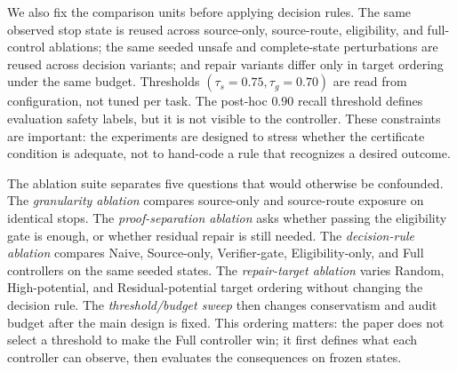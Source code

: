 \documentclass[letterpaper,10pt,twocolumn]{article}
\begin{document}
We also fix the comparison units before applying decision rules. The same
observed stop state is reused across source-only, source-route, eligibility, and
full-control ablations; the same seeded unsafe and complete-state perturbations
are reused across decision variants; and repair variants differ only in target
ordering under the same budget. Thresholds \((\tau_s=0.75,\tau_g=0.70)\) are
read from configuration, not tuned per task. The post-hoc \(0.90\) recall
threshold defines evaluation safety labels, but it is not visible to the
controller. These constraints are important: the experiments are designed to
stress whether the certificate condition is adequate, not to hand-code a rule
that recognizes a desired outcome.

The ablation suite separates five questions that would otherwise be confounded.
The \emph{granularity ablation} compares source-only and source-route exposure
on identical stops. The \emph{proof-separation ablation} asks whether passing
the eligibility gate is enough, or whether residual repair is still needed. The
\emph{decision-rule ablation} compares Naive, Source-only, Verifier-gate,
Eligibility-only, and Full controllers on the same seeded states. The
\emph{repair-target ablation} varies Random, High-potential, and
Residual-potential target ordering without changing the decision rule. The
\emph{threshold/budget sweep} then changes conservatism and audit budget after
the main design is fixed. This ordering matters: the paper does not select a
threshold to make the Full controller win; it first defines what each controller
can observe, then evaluates the consequences on frozen states.
\end{document}
